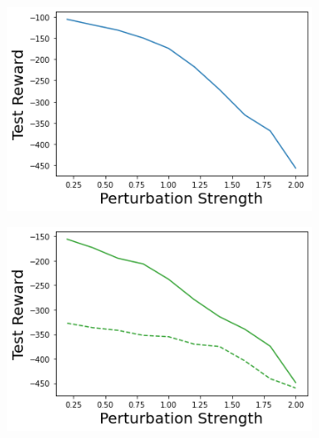 \begin{figure}
\begin{subfigure}{.245\textwidth}
    \end{subfigure}
    \begin{subfigure}{.245\textwidth}
        \includegraphics[width=\textwidth]{sections/011_icml2022/resources/action_shift-DKL-AcrobotShift-v0-mean_reward_.png}
    \end{subfigure}
    \begin{subfigure}{.245\textwidth}
        \includegraphics[width=\textwidth]{sections/011_icml2022/resources/action_shift-PostNet-AcrobotShift-v0-mean_reward_.png}
    \end{subfigure}
    

\end{figure}

